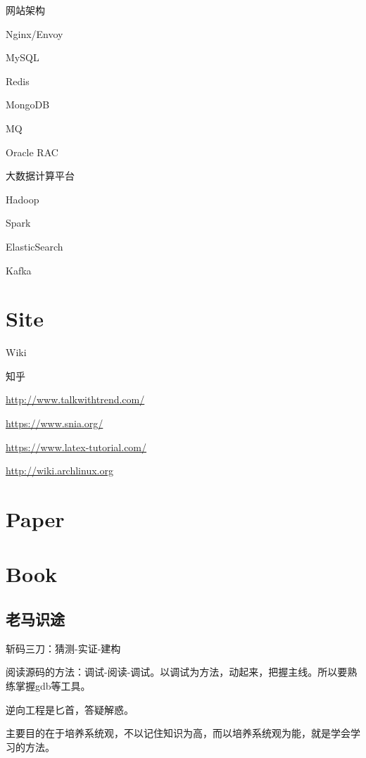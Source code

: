 网站架构
\begin{enumbox}
\item Nginx/Envoy
\item MySQL
\item Redis
\item MongoDB
\item MQ
\item Oracle RAC
\end{enumbox}

大数据计算平台
\begin{enumbox}
\item Hadoop
\item Spark
\item ElasticSearch
\item Kafka
\end{enumbox}

\section{Site}

\begin{enumbox}
\item Wiki
\item 知乎
\item \url{http://www.talkwithtrend.com/}
\item \url{https://www.snia.org/}
\item \url{https://www.latex-tutorial.com/}
\item \url{http://wiki.archlinux.org}
\end{enumbox}

\section{Paper}

\section{Book}

\subsection{老马识途}

斩码三刀：猜测-实证-建构

阅读源码的方法：调试-阅读-调试。以调试为方法，动起来，把握主线。所以要熟练掌握gdb等工具。

逆向工程是匕首，答疑解惑。

主要目的在于培养系统观，不以记住知识为高，而以培养系统观为能，就是学会学习的方法。

